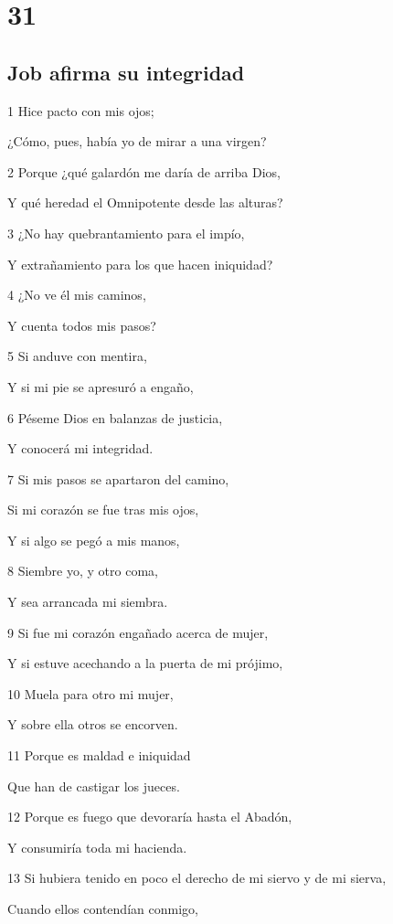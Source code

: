 \chapter{31}

\section*{Job afirma su integridad}

\par 1 Hice pacto con mis ojos;
\par ¿Cómo, pues, había yo de mirar a una virgen?
\par 2 Porque ¿qué galardón me daría de arriba Dios,
\par Y qué heredad el Omnipotente desde las alturas?
\par 3 ¿No hay quebrantamiento para el impío,
\par Y extrañamiento para los que hacen iniquidad?
\par 4 ¿No ve él mis caminos,
\par Y cuenta todos mis pasos?
\par 5 Si anduve con mentira,
\par Y si mi pie se apresuró a engaño,
\par 6 Péseme Dios en balanzas de justicia,
\par Y conocerá mi integridad.
\par 7 Si mis pasos se apartaron del camino,
\par Si mi corazón se fue tras mis ojos,
\par Y si algo se pegó a mis manos,
\par 8 Siembre yo, y otro coma,
\par Y sea arrancada mi siembra.
\par 9 Si fue mi corazón engañado acerca de mujer,
\par Y si estuve acechando a la puerta de mi prójimo, 
\par 10 Muela para otro mi mujer,
\par Y sobre ella otros se encorven.
\par 11 Porque es maldad e iniquidad
\par Que han de castigar los jueces.
\par 12 Porque es fuego que devoraría hasta el Abadón,
\par Y consumiría toda mi hacienda.
\par 13 Si hubiera tenido en poco el derecho de mi siervo y de mi sierva,
\par Cuando ellos contendían conmigo,
